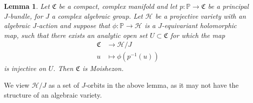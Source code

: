 \documentclass[10pt,letterpaper,english,reqno]{amsart}
\numberwithin{equation}{subsection}
\newcommand\cH{{\mathcal H}}
\newcommand\fC{{\mathfrak C}}
\newcommand\bP{{\mathbb P}}
\newtheorem{lemma}[theorem]{Lemma}
\theoremstyle{definition}
\begin{document}
\begin{lemma}\label{orbit-mero}
Let $\fC$ be a compact, complex manifold
and let $p \colon \bP\to \fC$ be a principal $J$-bundle, 
for $J$ a complex algebraic group. Let $\cH$ be a projective
variety with an algebraic $J$-action and suppose that
$\phi\colon \bP\to \cH$ is a $J$-equivariant holomorphic
map, such that there exists an analytic open
set $U\subset \fC$ for which the map
\begin{align*} 
\fC &\to \cH/J \\
u &\mapsto \phi(p^{-1}(u)) \end{align*}
is injective on $U$. Then $\fC$ is Moishezon.
\end{lemma}

We view $\cH/J$ as a set of $J$-orbits in the above lemma,
as it may not have the structure of an algebraic variety.
\end{document}
